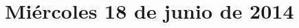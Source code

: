 \documentclass[12pt,spanish]{article}
\begin{document}
  \thispagestyle{empty}
  \pagestyle{empty}
  \section*{Miércoles 18 de junio de 2014}

  \begin{certamen}
    \item
      
    \item
      
    \item
      
  \end{certamen}
\end{document}
